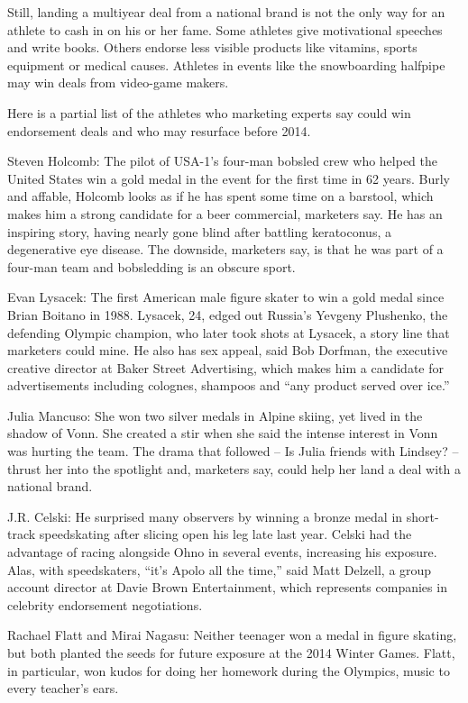 ﻿\documentclass[12pt]{article}
\begin{document}
Still, landing a multiyear deal from a national brand is not the only way for an athlete to cash in
on his or her fame. Some athletes give motivational speeches and write books. Others endorse less
visible products like vitamins, sports equipment or medical causes. Athletes in events like the
snowboarding halfpipe may win deals from video-game makers.

Here is a partial list of the athletes who marketing experts say could win endorsement deals and who
may resurface before 2014.

Steven Holcomb: The pilot of USA-1's four-man bobsled crew who helped the United States win a gold
medal in the event for the first time in 62 years. Burly and affable, Holcomb looks as if he has
spent some time on a barstool, which makes him a strong candidate for a beer commercial, marketers
say. He has an inspiring story, having nearly gone blind after battling keratoconus, a degenerative
eye disease. The downside, marketers say, is that he was part of a four-man team and bobsledding is
an obscure sport.

Evan Lysacek: The first American male figure skater to win a gold medal since Brian Boitano in
1988. Lysacek, 24, edged out Russia's Yevgeny Plushenko, the defending Olympic champion, who later
took shots at Lysacek, a story line that marketers could mine. He also has sex appeal, said Bob
Dorfman, the executive creative director at Baker Street Advertising, which makes him a candidate
for advertisements including colognes, shampoos and ``any product served over ice.''

Julia Mancuso: She won two silver medals in Alpine skiing, yet lived in the shadow of Vonn. She
created a stir when she said the intense interest in Vonn was hurting the team. The drama that
followed -- Is Julia friends with Lindsey? -- thrust her into the spotlight and, marketers say,
could help her land a deal with a national brand.

J.R. Celski: He surprised many observers by winning a bronze medal in short-track speedskating
after slicing open his leg late last year. Celski had the advantage of racing alongside Ohno in
several events, increasing his exposure. Alas, with speedskaters, ``it's Apolo all the time,'' said
Matt Delzell, a group account director at Davie Brown Entertainment, which represents companies in
celebrity endorsement negotiations.

Rachael Flatt and Mirai Nagasu: Neither teenager won a medal in figure skating, but both planted
the seeds for future exposure at the 2014 Winter Games. Flatt, in particular, won kudos for doing
her homework during the Olympics, music to every teacher's ears.
\end{document}
